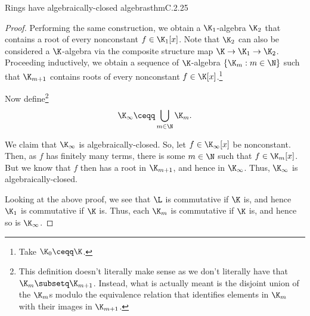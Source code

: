 \begin{thm}{Rings have algebraically-closed algebras}{thmC.2.25}
\begin{proof}
		Performing the same construction, we obtain a $\K _1$-algebra $\K _2$ that contains a root of every nonconstant $f\in \K _1[x]$.  Note that $\K _2$ can also be considered a $\K$-algebra via the composite structure map $\K \rightarrow \K _1\rightarrow \K _2$.  Proceeding inductively, we obtain a sequence of $\K$-algebra $\{ \K _m:m\in \N \}$ such that $\K _{m+1}$ contains roots of every nonconstant $f\in \K [x]$.\footnote{Take $\K _0\ceqq \K$.}
		
		Now define\footnote{This definition doesn't literally make sense as we don't literally have that $\K _m\subsetq \K _{m+1}$.  Instead, what is actually meant is the disjoint union of the $\K _m$s modulo the equivalence relation that identifies elements in $\K _m$ with their images in $\K _{m+1}$.}
		\begin{equation}
			\K _{\infty}\ceqq \bigcup _{m\in \N}\K _m.
		\end{equation}
		
		We claim that $\K _{\infty}$ is algebraically-closed.  So, let $f\in \K _{\infty}[x]$ be nonconstant.  Then, as $f$ has finitely many terms, there is some $m\in \N$ such that $f\in \K _m[x]$.  But we know that $f$ then has a root in $\K _{m+1}$, and hence in $\K _{\infty}$.  Thus, $\K _{\infty}$ is algebraically-closed.
		
		Looking at the above proof, we see that $\L$ is commutative if $\K$ is, and hence $\K _1$ is commutative if $\K$ is.  Thus, each $\K _m$ is commutative if $\K$ is, and hence so is $\K _{\infty}$.
		

\end{proof}
\end{thm}

